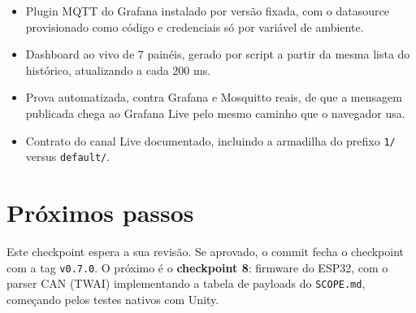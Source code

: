 \documentclass[11pt,a4paper]{article}
\begin{document}
\begin{itemize}
    \item Plugin MQTT do Grafana instalado por versão fixada, com o datasource provisionado como código e credenciais só por variável de ambiente.
    \item Dashboard ao vivo de 7 painéis, gerado por script a partir da mesma lista do histórico, atualizando a cada 200 ms.
    \item Prova automatizada, contra Grafana e Mosquitto reais, de que a mensagem publicada chega ao Grafana Live pelo mesmo caminho que o navegador usa.
    \item Contrato do canal Live documentado, incluindo a armadilha do prefixo \texttt{1/} versus \texttt{default/}.
\end{itemize}

\section{Próximos passos}

Este checkpoint espera a sua revisão. Se aprovado, o commit fecha o checkpoint com a tag \texttt{v0.7.0}. O próximo é o \textbf{checkpoint 8}: firmware do ESP32, com o parser CAN (TWAI) implementando a tabela de payloads do \texttt{SCOPE.md}, começando pelos testes nativos com Unity.
\end{document}

